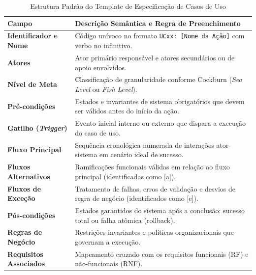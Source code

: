 \begin{table}[!ht]
\centering
\caption{Estrutura Padrão do Template de Especificação de Casos de Uso}
\label{qua_template_caso_uso}
\footnotesize
\begin{tabularx}{\textwidth}{p{3.8cm} X}
\toprule
\textbf{Campo} & \textbf{Descrição Semântica e Regra de Preenchimento} \\
\midrule
\textbf{Identificador e Nome} & Código unívoco no formato \texttt{UCxx: [Nome da Ação]} com verbo no infinitivo. \\
\textbf{Atores} & Ator primário responsável e atores secundários ou de apoio envolvidos. \\
\textbf{Nível de Meta} & Classificação de granularidade conforme Cockburn (\textit{Sea Level} ou \textit{Fish Level}). \\
\textbf{Pré-condições} & Estados e invariantes de sistema obrigatórios que devem ser válidos antes do início da ação. \\
\textbf{Gatilho (\textit{Trigger})} & Evento inicial interno ou externo que dispara a execução do caso de uso. \\
\textbf{Fluxo Principal} & Sequência cronológica numerada de interações ator-sistema em cenário ideal de sucesso. \\
\textbf{Fluxos Alternativos} & Ramificações funcionais válidas em relação ao fluxo principal (identificadas como [a]). \\
\textbf{Fluxos de Exceção} & Tratamento de falhas, erros de validação e desvios de regra de negócio (identificados como [e]). \\
\textbf{Pós-condições} & Estados garantidos do sistema após a conclusão: sucesso total ou falha atômica (rollback). \\
\textbf{Regras de Negócio} & Restrições invariantes e políticas organizacionais que governam a execução. \\
\textbf{Requisitos Associados} & Mapeamento cruzado com os requisitos funcionais (RF) e não-funcionais (RNF). \\
\bottomrule
\end{tabularx}
\end{table}
